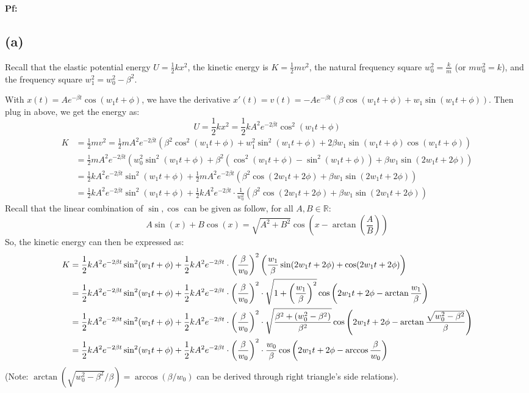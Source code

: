 \documentclass{article}
\newcommand{\RR}{\mathbb{R}}
\DeclarePairedDelimiter{\paran}{(}{)}%
\begin{document}
\textbf{Pf:}

\subsection*{(a)}
Recall that the elastic potential energy $U=\frac{1}{2}kx^2$, the kinetic energy is $K=\frac{1}{2}mv^2$, the natural frequency square $w_0^2=\frac{k}{m}$ (or $mw_0^2=k$), and the frequency square $w_1^2=w_0^2-\beta^2$.

With $x(t)=Ae^{-\beta t}\cos(w_1t+\phi)$, we have the derivative $x'(t)=v(t)=-Ae^{-\beta t}(\beta \cos(w_1t+\phi)+w_1\sin(w_1t+\phi))$. Then plug in above, we get the energy as:
\begin{equation}
    U=\frac{1}{2}kx^2 = \frac{1}{2}kA^2e^{-2\beta t}\cos^2(w_1t+\phi)
\end{equation}
\begin{align}
    K&=\frac{1}{2}mv^2 = \frac{1}{2}mA^2e^{-2\beta t}(\beta^2\cos^2(w_1t+\phi)+w_1^2\sin^2(w_1t+\phi)+2\beta w_1\sin(w_1t+\phi)\cos(w_1t+\phi))\\
    &= \frac{1}{2}mA^2e^{-2\beta t}(w_0^2\sin^2(w_1t+\phi)+\beta^2(\cos^2(w_1t+\phi)-\sin^2(w_1t+\phi))+\beta w_1\sin(2w_1t+2\phi))\\
    &= \frac{1}{2}kA^2e^{-2\beta t}\sin^2(w_1t+\phi) + \frac{1}{2}mA^2e^{-2\beta t}(\beta^2\cos(2w_1t+2\phi)+\beta w_1\sin(2w_1t+2\phi))\\
    &=\frac{1}{2}kA^2e^{-2\beta t}\sin^2(w_1t+\phi) + \frac{1}{2}kA^2e^{-2\beta t}\cdot\frac{1}{w_0^2}\left(\beta^2\cos(2w_1t+2\phi)+\beta w_1\sin(2w_1t+2\phi)\right)
\end{align}
Recall that the linear combination of $\sin,\cos$ can be given as follow, for all $A,B\in \RR$:
\begin{equation}
    A\sin(x)+B\cos(x) = \sqrt{A^2+B^2}\cos\left(x-\arctan\left(\frac{A}{B}\right)\right)
\end{equation}
So, the kinetic energy can then be expressed as:
\begin{align}
    K&= \frac{1}{2}kA^2e^{-2\beta t}\sin^2(w_1t+\phi)+\frac{1}{2}kA^2e^{-2\beta t}\cdot\left(\frac{\beta}{w_0}\right)^2\paran*{\frac{w_1}{\beta}\sin(2w_1t+2\phi)+\cos(2w_1t+2\phi)}\\
    &=\frac{1}{2}kA^2e^{-2\beta t}\sin^2(w_1t+\phi)+\frac{1}{2}kA^2e^{-2\beta t}\cdot\left(\frac{\beta}{w_0}\right)^2\cdot \sqrt{1+\left(\frac{w_1}{\beta}\right)^2}\cos\left(2w_1t+2\phi - \arctan\frac{w_1}{\beta}\right)\\
    &=\frac{1}{2}kA^2e^{-2\beta t}\sin^2(w_1t+\phi)+\frac{1}{2}kA^2e^{-2\beta t}\cdot\left(\frac{\beta}{w_0}\right)^2\cdot \sqrt{\frac{\beta^2+(w_0^2-\beta^2)}{\beta^2}}\cos\left(2w_1t+2\phi - \arctan\frac{\sqrt{w_0^2-\beta^2}}{\beta}\right)\\
    &= \frac{1}{2}kA^2e^{-2\beta t}\sin^2(w_1t+\phi)+\frac{1}{2}kA^2e^{-2\beta t}\cdot\left(\frac{\beta}{w_0}\right)^2\cdot \frac{w_0}{\beta}\cos\left(2w_1t+2\phi - \arccos\frac{\beta}{w_0}\right)
\end{align}
(Note: $\arctan(\sqrt{w_0^2-\beta^2}/\beta)=\arccos(\beta/w_0)$ can be derived through right triangle's side relations).
\end{document}
